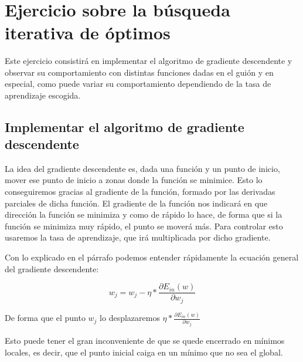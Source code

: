 \documentclass[12pt, spanish]{article}
\makeatletter
\let\thedate\@date
\makeatother
\begin{document}
\begin{titlepage}
    {\large \thedate}\\[0.5cm]
    {\doclicenseThis}
 	
    \vfill
    
\end{titlepage}


\tableofcontents
\pagebreak


\section{Ejercicio sobre la búsqueda iterativa de óptimos}

Este ejercicio consistirá en implementar el algoritmo de gradiente descendente y observar su comportamiento con distintas funciones dadas en el guión y en especial, como puede variar su comportamiento dependiendo de la tasa de aprendizaje escogida.

\subsection{Implementar el algoritmo de gradiente descendente}

La idea del gradiente descendente es, dada una función y un punto de inicio, mover ese punto de inicio a zonas donde la función se minimice. Esto lo conseguiremos gracias al gradiente de la función, formado por las derivadas parciales de dicha función. El gradiente de la función nos indicará en que dirección la función se minimiza y como de rápido lo hace, de forma que si la función se minimiza muy rápido, el punto se moverá más. Para controlar esto usaremos la tasa de aprendizaje, que irá multiplicada por dicho gradiente\cite{teoria}.

Con lo explicado en el párrafo podemos entender rápidamente la ecuación general del gradiente descendente:

$$ w_j = w_j - \eta * \frac{\partial E_{in}(w)}{\partial w_j} $$

De forma que el punto $w_j$ lo desplazaremos $\eta * \frac{\partial E_{in}(w)}{\partial w_j} $

Esto puede tener el gran inconveniente de que se quede encerrado en mínimos locales, es decir, que el punto inicial caiga en un mínimo que no sea el global.
\end{document}

